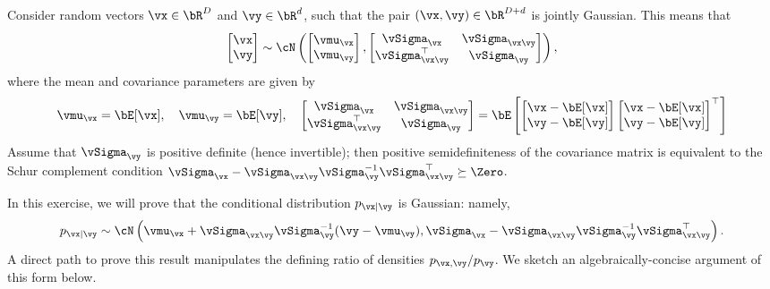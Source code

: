 \documentclass[../../book-main.tex]{subfiles}
\begin{document}
\begin{exercise}\label{exercise:conditional_gaussian}
  Consider random vectors $\vx \in \bR^D$ and $\vy \in \bR^d$, such that the
  pair $(\vx, \vy) \in \bR^{D + d}$ is jointly Gaussian. This means that
  \begin{equation*}
    \begin{bmatrix}
      \vx \\
      \vy
    \end{bmatrix}
    \sim
    \cN \left(
      \begin{bmatrix}
        \vmu_{\vx} \\
        \vmu_{\vy}
      \end{bmatrix}
      ,
      \begin{bmatrix}
        \vSigma_{\vx} & \vSigma_{\vx\vy} \\
        \vSigma_{\vx\vy}^\top & \vSigma_{\vy}
      \end{bmatrix}
    \right),
  \end{equation*}
  where the mean and covariance parameters are given by
  \begin{equation*}
    \vmu_{\vx} = \bE[\vx],\quad \vmu_{\vy} = \bE[\vy],\quad
    \begin{bmatrix}
      \vSigma_{\vx} & \vSigma_{\vx\vy} \\
      \vSigma_{\vx\vy}^\top & \vSigma_{\vy}
    \end{bmatrix}
    =
    \bE\left[
      \begin{bmatrix}
        \vx - \bE[\vx] \\
        \vy - \bE[\vy]
      \end{bmatrix}
      \begin{bmatrix}
        \vx - \bE[\vx] \\
        \vy - \bE[\vy]
      \end{bmatrix}^\top
      \right]
  \end{equation*}
  Assume that $\vSigma_{\vy}$ is positive definite (hence invertible); then
  positive semidefiniteness of the covariance matrix is equivalent to the Schur
  complement condition $\vSigma_{\vx} - \vSigma_{\vx\vy} \vSigma_{\vy}^{-1}
  \vSigma_{\vx\vy}^\top \succeq \Zero$.

  In this exercise, we will prove that the conditional distribution $p_{\vx \mid
  \vy}$ is Gaussian: namely,
  \begin{equation}\label{eq:gaussian-conditional-eqn}
    p_{\vx \mid \vy} \sim \cN\left(
      \vmu_{\vx} + \vSigma_{\vx\vy} \vSigma_{\vy}^{-1} (\vy - \vmu_{\vy}),
      \vSigma_{\vx} - \vSigma_{\vx\vy} \vSigma_{\vy}^{-1}
      \vSigma_{\vx\vy}^{\top}
    \right).
  \end{equation}
  A direct path to prove this result manipulates the defining ratio of
  densities $p_{\vx, \vy} / p_{\vy}$. We sketch an algebraically-concise
  argument of this form below.


\end{exercise}
\end{document}
